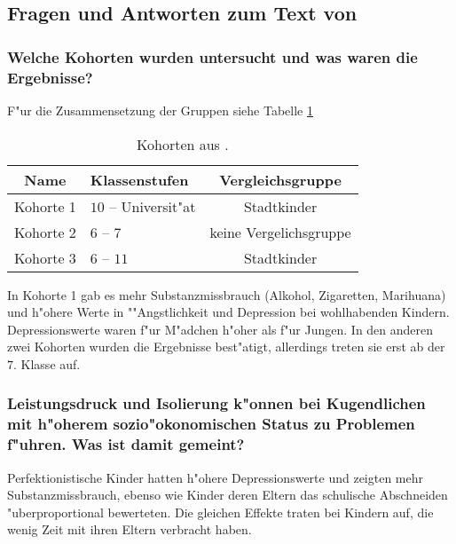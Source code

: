 \subsection{Fragen und Antworten zum Text von \textcite{luthar_children_2005}}
\subsubsection{Welche Kohorten wurden untersucht und was waren die Ergebnisse?}

F"ur die Zusammensetzung der Gruppen siehe Tabelle \ref{tab:cohorts}
\begin{table}
        \centering
        \begin{tabular}{c | l | c}
                Name & Klassenstufen & Vergleichsgruppe\\
                \hline
                \hline
                Kohorte 1 & $10$ -- Universit"at & Stadtkinder\\
                Kohorte 2 & $6$ -- $7$ & keine Vergelichsgruppe\\
                Kohorte 3 & $6$ -- $11$ & Stadtkinder
        \end{tabular}
        \caption{Kohorten aus \textcite{luthar_children_2005}.}
        \label{tab:cohorts}
\end{table}

In Kohorte 1 gab es mehr Substanzmissbrauch (Alkohol, Zigaretten, Marihuana) und h"ohere Werte in ""Angstlichkeit und Depression bei wohlhabenden Kindern. Depressionswerte waren f"ur M"adchen h"oher als f"ur Jungen. In den anderen zwei Kohorten wurden die Ergebnisse best"atigt, allerdings treten sie erst ab der $7.$ Klasse auf.

\subsubsection{Leistungsdruck und Isolierung k"onnen bei Kugendlichen mit h"oherem sozio"okonomischen Status zu Problemen f"uhren. Was ist damit gemeint?}
Perfektionistische Kinder hatten h"ohere Depressionswerte und zeigten mehr Substanzmissbrauch, ebenso wie Kinder deren Eltern das schulische Abschneiden "uberproportional bewerteten. Die gleichen Effekte traten bei Kindern auf, die wenig Zeit mit ihren Eltern verbracht haben.

